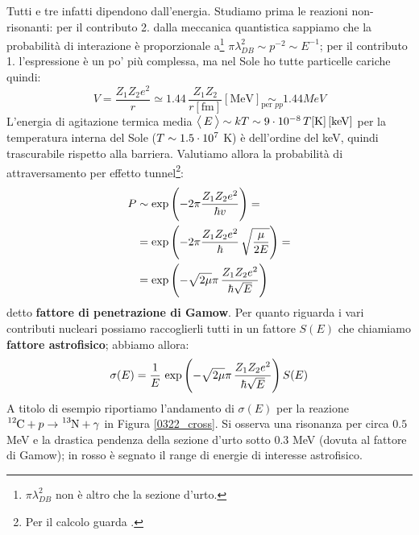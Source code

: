 Tutti e tre infatti dipendono dall'energia. Studiamo prima le reazioni non-risonanti: per il contributo 2. dalla meccanica quantistica sappiamo che la probabilità di interazione è proporzionale a\footnote{$\pi\lambda_{DB}^2$ non è altro che la sezione d'urto.} $\pi \lambda^2_{DB}\sim p^{-2} \sim E^{-1}$; per il contributo 1. l'espressione è un po' più complessa, ma nel Sole ho tutte particelle cariche quindi:
$$V = \frac{Z_1 Z_2 e^2}{r} \simeq 1.44 \, \frac{Z_1Z_2}{r[\mbox{fm}]} [\mbox{MeV}] \underset{\text{per }pp}{\sim} 1.44\unit{MeV}$$
L'energia di agitazione termica media $\bigl\langle\, E\, \bigr\rangle\sim kT \sim 9\cdot10^{-8} \, T[\mbox{K}]\,[\mbox{keV}]$ per la temperatura interna del Sole ($T\sim 1.5\cdot10^{7}$ K) è dell'ordine del keV, quindi trascurabile rispetto alla barriera. Valutiamo allora la probabilità di attraversamento per effetto tunnel\footnote{Per il calcolo guarda .}:\label{sec-tunnel}
\begin{displaymath}
\begin{aligned}
P &\sim \exp{\Biggl ( -2\pi \frac{Z_1Z_2 e^2}{\hbar v} \Biggr )} =\\
&= \exp{\Biggl ( -2\pi \frac{Z_1Z_2 e^2}{\hbar}\, \sqrt{\frac{\mu}{2E}} \Biggr )} =\\
&= \exp{\Biggl ( -\sqrt{2\mu}\pi\, \frac{Z_1Z_2 e^2}{\hbar \sqrt{E}} \Biggr )} 
\end{aligned}
\end{displaymath}
detto \textbf{fattore di penetrazione di Gamow}. Per quanto riguarda i vari contributi nucleari possiamo raccoglierli tutti in un fattore $S(E)$ che chiamiamo \textbf{fattore astrofisico}; abbiamo allora:
$$\sigma (E) = \frac{1}{E}\,\exp{\Biggl ( -\sqrt{2\mu}\pi\, \frac{Z_1Z_2 e^2}{\hbar \sqrt{E}} \Biggr )}\, S(E)$$
\noindent A titolo di esempio riportiamo l'andamento di $\sigma(E)$ per la reazione $\ce{^{12}C}+p\to \ce{^{13}N}+\gamma$ in Figura \ref{0322_cross}. Si osserva una risonanza per circa $0.5$ MeV e la drastica pendenza della sezione d'urto sotto $0.3$ MeV (dovuta al fattore di Gamow); in rosso è segnato il range di energie di interesse astrofisico.
